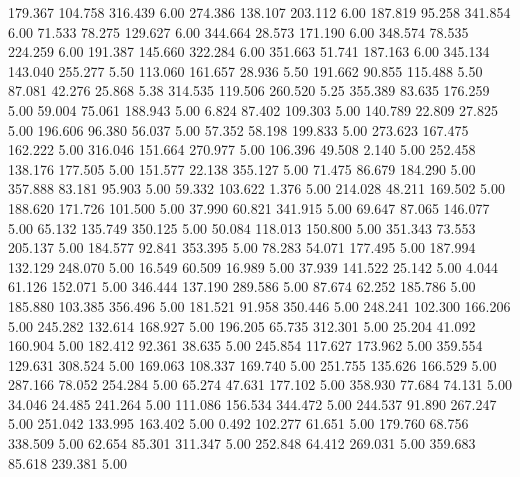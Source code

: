  179.367  104.758  316.439         6.00
 274.386  138.107  203.112         6.00
 187.819   95.258  341.854         6.00
  71.533   78.275  129.627         6.00
 344.664   28.573  171.190         6.00
 348.574   78.535  224.259         6.00
 191.387  145.660  322.284         6.00
 351.663   51.741  187.163         6.00
 345.134  143.040  255.277         5.50
 113.060  161.657   28.936         5.50
 191.662   90.855  115.488         5.50
  87.081   42.276   25.868         5.38
 314.535  119.506  260.520         5.25
 355.389   83.635  176.259         5.00
  59.004   75.061  188.943         5.00
   6.824   87.402  109.303         5.00
 140.789   22.809   27.825         5.00
 196.606   96.380   56.037         5.00
  57.352   58.198  199.833         5.00
 273.623  167.475  162.222         5.00
 316.046  151.664  270.977         5.00
 106.396   49.508    2.140         5.00
 252.458  138.176  177.505         5.00
 151.577   22.138  355.127         5.00
  71.475   86.679  184.290         5.00
 357.888   83.181   95.903         5.00
  59.332  103.622    1.376         5.00
 214.028   48.211  169.502         5.00
 188.620  171.726  101.500         5.00
  37.990   60.821  341.915         5.00
  69.647   87.065  146.077         5.00
  65.132  135.749  350.125         5.00
  50.084  118.013  150.800         5.00
 351.343   73.553  205.137         5.00
 184.577   92.841  353.395         5.00
  78.283   54.071  177.495         5.00
 187.994  132.129  248.070         5.00
  16.549   60.509   16.989         5.00
  37.939  141.522   25.142         5.00
   4.044   61.126  152.071         5.00
 346.444  137.190  289.586         5.00
  87.674   62.252  185.786         5.00
 185.880  103.385  356.496         5.00
 181.521   91.958  350.446         5.00
 248.241  102.300  166.206         5.00
 245.282  132.614  168.927         5.00
 196.205   65.735  312.301         5.00
  25.204   41.092  160.904         5.00
 182.412   92.361   38.635         5.00
 245.854  117.627  173.962         5.00
 359.554  129.631  308.524         5.00
 169.063  108.337  169.740         5.00
 251.755  135.626  166.529         5.00
 287.166   78.052  254.284         5.00
  65.274   47.631  177.102         5.00
 358.930   77.684   74.131         5.00
  34.046   24.485  241.264         5.00
 111.086  156.534  344.472         5.00
 244.537   91.890  267.247         5.00
 251.042  133.995  163.402         5.00
   0.492  102.277   61.651         5.00
 179.760   68.756  338.509         5.00
  62.654   85.301  311.347         5.00
 252.848   64.412  269.031         5.00
 359.683   85.618  239.381         5.00

